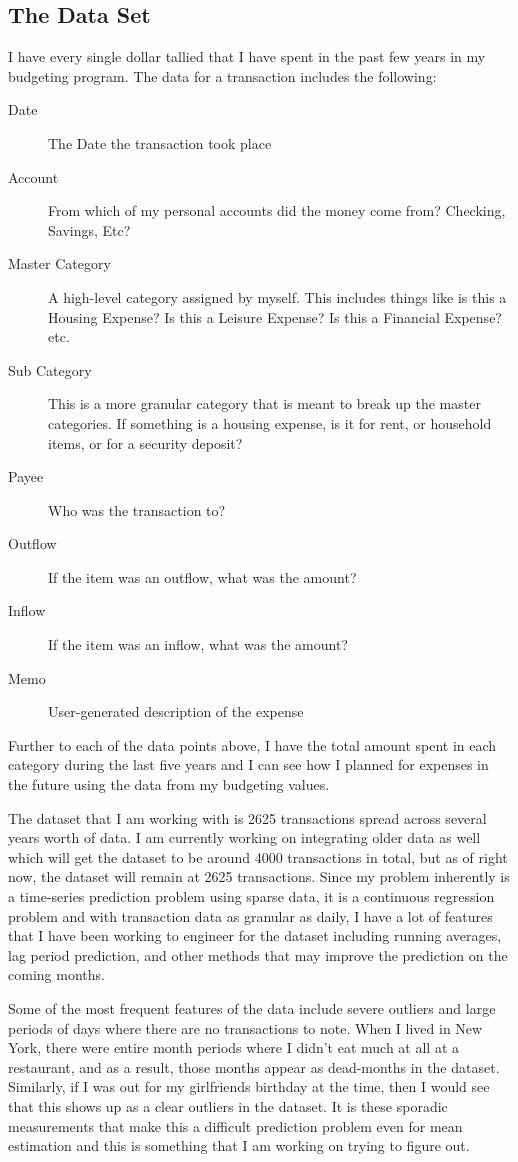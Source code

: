 \documentclass[11pt,a4paper]{article}
\begin{document}
\subsection{The Data Set}
I have every single dollar tallied that I have spent in the past few years in my budgeting program. The data for a transaction includes the following:
\begin{description}
	\item[Date] The Date the transaction took place
	\item[Account] From which of my personal accounts did the money come from? Checking, Savings, Etc?
	\item[Master Category] A high-level category assigned by myself. This includes things like is this a Housing Expense? Is this a Leisure Expense? Is this a Financial Expense? etc.
	\item[Sub Category] This is a more granular category that is meant to break up the master categories. If something is a housing expense, is it for rent, or household items, or for a security deposit?
	\item[Payee] Who was the transaction to?
	\item[Outflow] If the item was an outflow, what was the amount?
	\item[Inflow] If the item was an inflow, what was the amount?
	\item[Memo] User-generated description of the expense
\end{description}

Further to each of the data points above, I have the total amount spent in each category during the last five years and I can see how I planned for expenses in the future using the data from my budgeting values. 

The dataset that I am working with is 2625 transactions spread across several years worth of data. I am currently working on integrating older data as well which will get the dataset to be around 4000 transactions in total, but as of right now, the dataset will remain at 2625 transactions. Since my problem inherently is a time-series prediction problem using sparse data, it is a continuous regression problem and with transaction data as granular as daily, I have a lot of features that I have been working to engineer for the dataset including running averages, lag period prediction, and other methods that may improve the prediction on the coming months.

Some of the most frequent features of the data include severe outliers and large periods of days where there are no transactions to note. When I lived in New York, there were entire month periods where I didn't eat much at all at a restaurant, and as a result, those months appear as dead-months in the dataset. Similarly, if I was out for my girlfriends birthday at the time, then I would see that this shows up as a clear outliers in the dataset. It is these sporadic measurements that make this a difficult prediction problem even for mean estimation and this is something that I am working on trying to figure out. 
\end{document}
